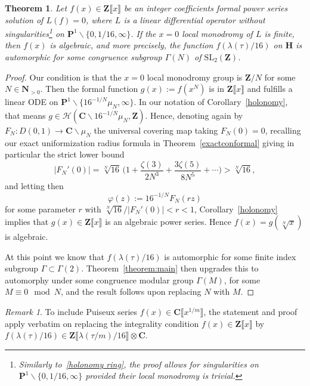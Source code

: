 \documentclass[10pt]{amsart}
\def\NwithoutzeroA{\mathbf{N}_{> 0}}
\renewcommand\setminus{\smallsetminus}
\def\Z{\mathbf{Z}}
\renewcommand\mathbb{\mathbf}
\newtheorem{theorem}[subsubsection]{Theorem}
\theoremstyle{remark}
\newtheorem{remark}[subsubsection]{Remark}
\numberwithin{equation}{subsection}
\def\C{\mathbf{C}}
\def\SL{\mathrm{SL}}
\def\H{\mathbf{H}}
\begin{document}
\begin{theorem} \label{ODE form}
Let $f(x) \in \Z\llbracket  x \rrbracket$ be an integer coefficients formal power series solution of $L(f) = 0$, where $L$ is a linear differential operator 
without singularities\footnote{Similarly to~\ref{holonomy ring}, the proof allows for singularities  on $\mathbb{P}^1 \setminus \{0, 1/16,\infty\}$ provided their local monodromy is trivial.}  on $\mathbb{P}^1 \setminus \{0,1/16,\infty\}$. If the $x = 0$ local monodromy of $L$ is finite, then $f(x)$ 
is algebraic, and more precisely, the function $f(\lambda(\tau)/16)$ on $\H$ is automorphic for some congruence subgroup $\Gamma(N)$ of $\SL_2(\Z)$.
\end{theorem}

\begin{proof}
Our condition is that the $x=0$ local monodromy group is $\Z / N$ for some $N \in \NwithoutzeroA$.
Then the formal function $g(x) := f(x^N)$ is in $\Z\llbracket x \rrbracket$ and fulfills a linear ODE on $\mathbb{P}^1 \setminus \{16^{-1/N}\mu_N, \infty\}$. In our notation of Corollary~\ref{holonomy}, that means $g \in \mathcal{H}(\C \setminus 16^{-1/N}\mu_N , \Z)$. Hence, denoting again by $F_N : D(0,1) \to \C \setminus \mu_N$ the universal covering map taking $F_N(0) = 0$, recalling  our exact uniformization radius formula in Theorem~\ref{exactconformal} giving in particular the strict lower bound
$$
|F_N'(0)| = \sqrt[N]{16} \, \Big(  1 + \frac{\zeta(3)}{2N^3}  + \frac{3\zeta(5)}{8N^5} + \cdots  \Big) > \sqrt[N]{16},
$$
 and letting then
$$
\varphi(z) := 16^{-1/N} F_N(rz)
$$
 for some parameter $r$ with $ \sqrt[N]{16} \big/ |F_N'(0)|  < r < 1$, Corollary~\ref{holonomy} implies that $g(x) \in \Z\llbracket x \rrbracket$ is an algebraic power series. Hence $f(x) = g(\sqrt[N]{x})$ is algebraic. 

 At this point we know that $f(\lambda(\tau)/16)$ is automorphic for some finite index subgroup $\Gamma \subset \Gamma(2)$. Theorem~\ref{theorem:main} then upgrades this to automorphy under some congruence modular group $\Gamma(M)$, for some $M \equiv 0 \mod{N}$, and the result follows upon replacing $N$ with $M$.
\end{proof}

\begin{remark} \label{Puiseux extension}
To include Puiseux series $f(x) \in \C\llbracket x^{1/m} \rrbracket$, the statement and proof apply verbatim on replacing the integrality condition $f(x) \in \Z\llbracket x \rrbracket$ by $f(\lambda(\tau)/16) \in \Z\llbracket \lambda(\tau/m) / 16 \rrbracket \otimes \C$.
\end{remark}
\end{document}
